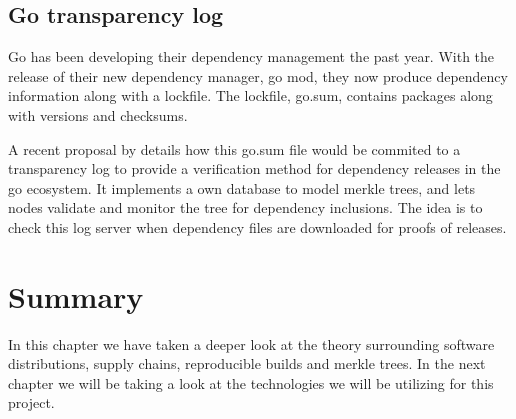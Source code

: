 \documentclass[../Main/thesis.tex]{subfiles}
\begin{document}
\subsection{Go transparency log}\label{sec:go-transparency-log}
Go has been developing their dependency management the past year. With the
release of their new dependency manager, go mod, they now produce dependency
information along with a lockfile. The lockfile, go.sum, contains packages along
with versions and checksums.

A recent proposal by \citeauthor{russ-cos-and-filippo-valsorda} details how this
go.sum file would be commited to a transparency log to provide a verification
method for dependency releases in the go ecosystem. It implements a own database
to model merkle trees, and lets nodes validate and monitor the tree for
dependency inclusions. The idea is to check this log server when dependency
files are downloaded for proofs of releases.\cite{russ-cos-and-filippo-valsorda}


\section*{Summary}\label{sec:summary-theory} 
In this chapter we have taken a deeper look at the theory surrounding software
distributions, supply chains, reproducible builds and merkle trees. In the next
chapter we will be taking a look at the technologies we will be utilizing for
this project.
\blankpage
\end{document}
